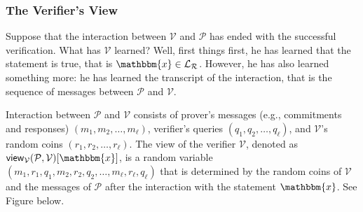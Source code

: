 \documentclass[../../book.tex]{subfiles}
\begin{document}
\subsubsection{The Verifier's View}
Suppose that the interaction between $\mathcal{V}$ and $\mathcal{P}$ has ended
with the successful verification. What has $\mathcal{V}$ learned? Well, first
things first, he has learned that the statement is true, that is $\mathbbm{x}
\in \mathcal{L}_{\mathcal{R}}$. However, he has also learned something more: he
has learned the transcript of the interaction, that is the sequence of messages
between $\mathcal{P}$ and $\mathcal{V}$.

\vspace{-1mm}

\begin{definition}
    Interaction between $\mathcal{P}$ and $\mathcal{V}$ consists of prover's
    messages (e.g., commitments and responses) $(m_1,m_2,\dots,m_{\ell})$,
    verifier's queries $(q_1,q_2,\dots,q_{\ell})$, and $\mathcal{V}$'s random
    coins $(r_1,r_2,\dots,r_{\ell})$. The view of the verifier $\mathcal{V}$,
    denoted as
    $\mathsf{view}_{\mathcal{V}}(\mathcal{P},\mathcal{V})[\mathbbm{x}]$, is a
    random variable $(m_1,r_1,q_1,m_2,r_2,q_2,\dots,m_{\ell},r_{\ell},q_{\ell})$
    that is determined by the random coins of $\mathcal{V}$ and the messages of
    $\mathcal{P}$ after the interaction with the statement $\mathbbm{x}$. See
    Figure below.
\end{definition}

\vspace{-3mm}
\end{document}
